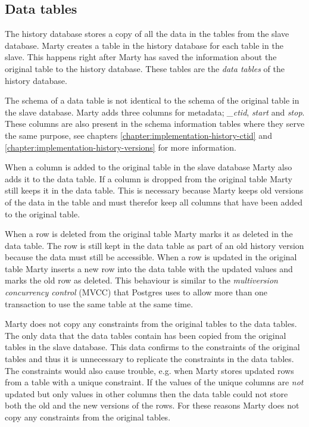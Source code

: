 \subsection{Data tables}
The history database stores a copy of all the data in the tables from the slave database.
Marty creates a table in the history database for each table in the slave.
This happens right after Marty has saved the information about the original table to the history database.
These tables are the \textit{data tables} of the history database.

The schema of a data table is not identical to the schema of the original table in the slave database.
Marty adds three columns for metadata; \textit{\_ctid}, \textit{start} and \textit{stop}.
These columns are also present in the schema information tables where they serve the same purpose, see chapters \ref{chapter:implementation-history-ctid} and \ref{chapter:implementation-history-versions} for more information.

When a column is added to the original table in the slave database Marty also adds it to the data table.
If a column is dropped from the original table Marty still keeps it in the data table.
This is necessary because Marty keeps old versions of the data in the table and must therefor keep all columns that have been added to the original table.

When a row is deleted from the original table Marty marks it as deleted in the data table.
The row is still kept in the data table as part of an old history version because the data must still be accessible.
When a row is updated in the original table Marty inserts a new row into the data table with the updated values and marks the old row as deleted.
This behaviour is similar to the \textit{multiversion concurrency control} (MVCC) that Postgres uses to allow more than one transaction to use the same table at the same time.

Marty does not copy any constraints from the original tables to the data tables.
The only data that the data tables contain has been copied from the original tables in the slave database.
This data confirms to the constraints of the original tables and thus it is unnecessary to replicate the constraints in the data tables.
The constraints would also cause trouble, e.g. when Marty stores updated rows from a table with a unique constraint.
If the values of the unique columns are \textit{not} updated but only values in other columns then the data table could not store both the old and the new versions of the rows.
For these reasons Marty does not copy any constraints from the original tables.

